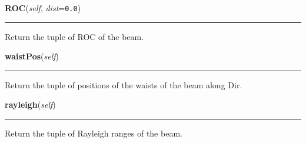 \hspace{.8\funcindent}\begin{boxedminipage}{\funcwidth}

    \raggedright \textbf{ROC}(\textit{self}, \textit{dist}={\tt 0.0})

    \vspace{-1.5ex}

    \rule{\textwidth}{0.5\fboxrule}
\setlength{\parskip}{2ex}
    Return the tuple of ROC of the beam.

\setlength{\parskip}{1ex}
    \end{boxedminipage}

    \label{theia:optics:beam:GaussianBeam:waistPos}

    \vspace{0.5ex}

\hspace{.8\funcindent}\begin{boxedminipage}{\funcwidth}

    \raggedright \textbf{waistPos}(\textit{self})

    \vspace{-1.5ex}

    \rule{\textwidth}{0.5\fboxrule}
\setlength{\parskip}{2ex}
    Return the tuple of positions of the waists of the beam along Dir.

\setlength{\parskip}{1ex}
    \end{boxedminipage}

    \label{theia:optics:beam:GaussianBeam:rayleigh}

    \vspace{0.5ex}

\hspace{.8\funcindent}\begin{boxedminipage}{\funcwidth}

    \raggedright \textbf{rayleigh}(\textit{self})

    \vspace{-1.5ex}

    \rule{\textwidth}{0.5\fboxrule}
\setlength{\parskip}{2ex}
    Return the tuple of Rayleigh ranges of the beam.

\setlength{\parskip}{1ex}
    \end{boxedminipage}

